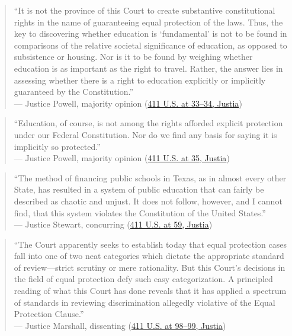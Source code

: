 \documentclass[12pt]{article}
\begin{document}
\begin{quote}
``It is not the province of this Court to create substantive constitutional rights in the name of guaranteeing equal protection of the laws. Thus, the key to discovering whether education is `fundamental' is not to be found in comparisons of the relative societal significance of education, as opposed to subsistence or housing. Nor is it to be found by weighing whether education is as important as the right to travel. Rather, the answer lies in assessing whether there is a right to education explicitly or implicitly guaranteed by the Constitution.'' \\
--- Justice Powell, majority opinion (\href{https://supreme.justia.com/cases/federal/us/411/1/}{411 U.S. at 33--34, Justia})
\end{quote}

\begin{quote}
``Education, of course, is not among the rights afforded explicit protection under our Federal Constitution. Nor do we find any basis for saying it is implicitly so protected.'' \\
--- Justice Powell, majority opinion (\href{https://supreme.justia.com/cases/federal/us/411/1/}{411 U.S. at 35, Justia})
\end{quote}

\begin{quote}
``The method of financing public schools in Texas, as in almost every other State, has resulted in a system of public education that can fairly be described as chaotic and unjust. It does not follow, however, and I cannot find, that this system violates the Constitution of the United States.'' \\
--- Justice Stewart, concurring (\href{https://supreme.justia.com/cases/federal/us/411/1/}{411 U.S. at 59, Justia})
\end{quote}

\begin{quote}
``The Court apparently seeks to establish today that equal protection cases fall into one of two neat categories which dictate the appropriate standard of review---strict scrutiny or mere rationality. But this Court's decisions in the field of equal protection defy such easy categorization. A principled reading of what this Court has done reveals that it has applied a spectrum of standards in reviewing discrimination allegedly violative of the Equal Protection Clause.'' \\
--- Justice Marshall, dissenting (\href{https://supreme.justia.com/cases/federal/us/411/1/}{411 U.S. at 98--99, Justia})
\end{quote}
\end{document}
